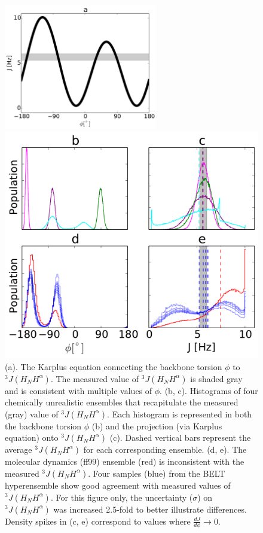 \documentclass[journal=jacsat,manuscript=article]{achemso}
\begin{document}
\begin{figure}

\includegraphics[height=5.5cm]{figures/karplus_top_panel_karplus.pdf}

\includegraphics[height=10.0cm]{figures/karplus_2x2.pdf}

\caption{
(a).  The Karplus equation connecting the backbone torsion $\phi$ to $^3J(H_NH^\alpha)$.  The measured value of $^3J(H_NH^\alpha)$ is shaded gray and is consistent with multiple values of $\phi$.  (b, c).  Histograms of four chemically unrealistic ensembles that recapitulate the measured (gray) value of $^3J(H_NH^\alpha)$.  Each histogram is represented in both the backbone torsion $\phi$ (b) and the projection (via Karplus equation) onto $^3J(H_NH^\alpha)$ (c).  Dashed vertical bars represent the average $^3J(H_NH^\alpha)$ for each corresponding ensemble.  (d, e).  The molecular dynamics (ff99) ensemble (red) is inconsistent with the measured $^3J(H_NH^\alpha)$.  Four samples (blue) from the BELT hyperensemble show good agreement with measured values of $^3J(H_NH^\alpha)$.  For this figure only, the uncertainty ($\sigma$) on $^3J(H_NH^\alpha)$ was increased 2.5-fold to better illustrate differences.  Density spikes in (c, e) correspond to values where $\frac{dJ}{d\phi} \rightarrow 0$.  
}
\label{figure:Ambiguity}
\end{figure}
\end{document}
